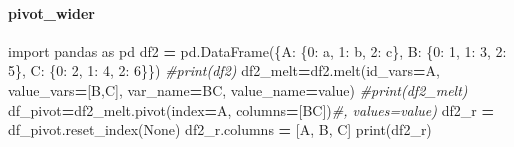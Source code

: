 \documentclass[
]{article}
\newenvironment{Shaded}{\begin{snugshade}}{\end{snugshade}}
\newcommand{\BuiltInTok}[1]{#1}
\newcommand{\CommentTok}[1]{\textcolor[rgb]{0.56,0.35,0.01}{\textit{#1}}}
\newcommand{\DecValTok}[1]{\textcolor[rgb]{0.00,0.00,0.81}{#1}}
\newcommand{\ImportTok}[1]{#1}
\newcommand{\NormalTok}[1]{#1}
\newcommand{\OperatorTok}[1]{\textcolor[rgb]{0.81,0.36,0.00}{\textbf{#1}}}
\newcommand{\StringTok}[1]{\textcolor[rgb]{0.31,0.60,0.02}{#1}}
\newcommand{\VariableTok}[1]{\textcolor[rgb]{0.00,0.00,0.00}{#1}}
\begin{document}
\hypertarget{pivot_wider}{%
\paragraph{\texorpdfstring{{ pivot\_wider
}}{ pivot\_wider }}\label{pivot_wider}}

\begin{Shaded}
\begin{Highlighting}[]
\ImportTok{import}\NormalTok{ pandas }\ImportTok{as}\NormalTok{ pd}
\NormalTok{df2 }\OperatorTok{=}\NormalTok{ pd.DataFrame(\{}\StringTok{\textquotesingle{}A\textquotesingle{}}\NormalTok{: \{}\DecValTok{0}\NormalTok{: }\StringTok{\textquotesingle{}a\textquotesingle{}}\NormalTok{, }\DecValTok{1}\NormalTok{: }\StringTok{\textquotesingle{}b\textquotesingle{}}\NormalTok{, }\DecValTok{2}\NormalTok{: }\StringTok{\textquotesingle{}c\textquotesingle{}}\NormalTok{\},}
                   \StringTok{\textquotesingle{}B\textquotesingle{}}\NormalTok{: \{}\DecValTok{0}\NormalTok{: }\DecValTok{1}\NormalTok{, }\DecValTok{1}\NormalTok{: }\DecValTok{3}\NormalTok{, }\DecValTok{2}\NormalTok{: }\DecValTok{5}\NormalTok{\},}
                   \StringTok{\textquotesingle{}C\textquotesingle{}}\NormalTok{: \{}\DecValTok{0}\NormalTok{: }\DecValTok{2}\NormalTok{, }\DecValTok{1}\NormalTok{: }\DecValTok{4}\NormalTok{, }\DecValTok{2}\NormalTok{: }\DecValTok{6}\NormalTok{\}\})}
\CommentTok{\#print(df2)}
\NormalTok{df2\_melt}\OperatorTok{=}\NormalTok{df2.melt(id\_vars}\OperatorTok{=}\StringTok{\textquotesingle{}A\textquotesingle{}}\NormalTok{, value\_vars}\OperatorTok{=}\NormalTok{[}\StringTok{\textquotesingle{}B\textquotesingle{}}\NormalTok{,}\StringTok{\textquotesingle{}C\textquotesingle{}}\NormalTok{], var\_name}\OperatorTok{=}\StringTok{\textquotesingle{}BC\textquotesingle{}}\NormalTok{, value\_name}\OperatorTok{=}\StringTok{\textquotesingle{}value\textquotesingle{}}\NormalTok{)}
\CommentTok{\#print(df2\_melt)}
\NormalTok{df\_pivot}\OperatorTok{=}\NormalTok{df2\_melt.pivot(index}\OperatorTok{=}\StringTok{\textquotesingle{}A\textquotesingle{}}\NormalTok{, columns}\OperatorTok{=}\NormalTok{[}\StringTok{\textquotesingle{}BC\textquotesingle{}}\NormalTok{])}\CommentTok{\#, values=\textquotesingle{}value\textquotesingle{})}
\NormalTok{df2\_r }\OperatorTok{=}\NormalTok{ df\_pivot.reset\_index(}\VariableTok{None}\NormalTok{)}
\NormalTok{df2\_r.columns }\OperatorTok{=}\NormalTok{ [}\StringTok{\textquotesingle{}A\textquotesingle{}}\NormalTok{, }\StringTok{\textquotesingle{}B\textquotesingle{}}\NormalTok{, }\StringTok{\textquotesingle{}C\textquotesingle{}}\NormalTok{]}
\BuiltInTok{print}\NormalTok{(df2\_r)}
\end{Highlighting}
\end{Shaded}
\end{document}
